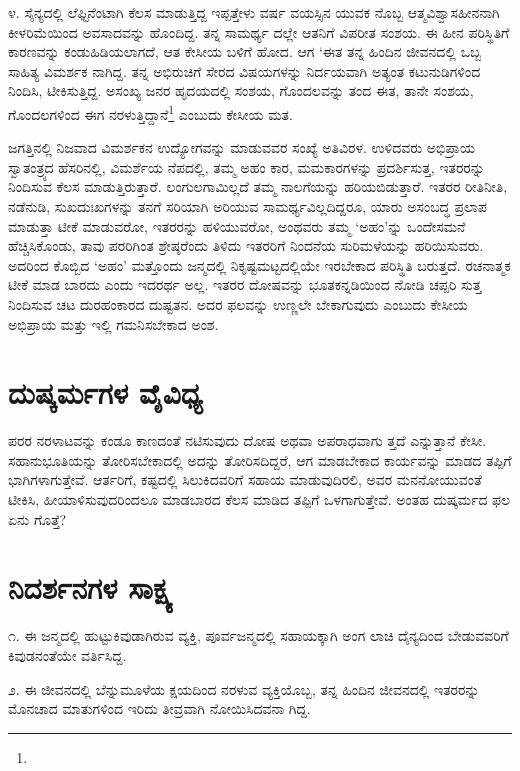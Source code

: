 ೪. ಸೈನ್ಯದಲ್ಲಿ ಲೆಫ್ಟಿನೆಂಟಾಗಿ ಕೆಲಸ ಮಾಡುತ್ತಿದ್ದ ಇಪ್ಪತ್ತೇಳು ವರ್ಷ ವಯಸ್ಸಿನ ಯುವಕ ನೊಬ್ಬ ಆತ್ಮವಿಶ್ವಾಸಹೀನನಾಗಿ ಕೀಳರಿಮೆಯಿಂದ ಅವಸಾದವನ್ನು ಹೊಂದಿದ್ದ. ತನ್ನ ಸಾಮರ್ಥ್ಯ ದಲ್ಲೇ ಆತನಿಗೆ ವಿಪರೀತ ಸಂಶಯ. ಈ ಹೀನ ಪರಿಸ್ಥಿತಿಗೆ ಕಾರಣವನ್ನು ಕಂಡುಹಿಡಿಯಲಾಗದೆ, ಆತ ಕೇಸೀಯ ಬಳಿಗೆ ಹೋದ. ಆಗ ‘ಈತ ತನ್ನ ಹಿಂದಿನ ಜೀವನದಲ್ಲಿ ಒಬ್ಬ ಸಾಹಿತ್ಯ ವಿಮರ್ಶಕ ನಾಗಿದ್ದ. ತನ್ನ ಅಭಿರುಚಿಗೆ ಸೇರದ ವಿಷಯಗಳನ್ನು ನಿರ್ದಯವಾಗಿ ಅತ್ಯಂತ ಕಟುನುಡಿಗಳಿಂದ ನಿಂದಿಸಿ, ಟೀಕಿಸುತ್ತಿದ್ದ. ಅಸಂಖ್ಯ ಜನರ ಹೃದಯದಲ್ಲಿ ಸಂಶಯ, ಗೊಂದಲವನ್ನು ತಂದ ಈತ, ತಾನೇ ಸಂಶಯ, ಗೊಂದಲಗಳಿಂದ ಈಗ ನರಳುತ್ತಿದ್ದಾನೆ\footnote{} ಎಂಬುದು ಕೇಸೀಯ ಮತ.

ಜಗತ್ತಿನಲ್ಲಿ ನಿಜವಾದ ವಿಮರ್ಶಕನ ಉದ್ಯೋಗವನ್ನು ಮಾಡುವವರ ಸಂಖ್ಯೆ ಅತಿವಿರಳ. ಉಳಿದವರು ಅಭಿಪ್ರಾಯ ಸ್ವಾತಂತ್ರ್ಯದ ಹೆಸರಿನಲ್ಲಿ, ವಿಮರ್ಶೆಯ ನೆಪದಲ್ಲಿ, ತಮ್ಮ ಅಹಂ ಕಾರ, ಮಮಕಾರಗಳನ್ನು ಪ್ರದರ್ಶಿಸುತ್ತ, ಇತರರನ್ನು ನಿಂದಿಸುವ ಕೆಲಸ ಮಾಡುತ್ತಿರುತ್ತಾರೆ. ಲಂಗುಲಗಾಮಿಲ್ಲದೆ ತಮ್ಮ ನಾಲಗೆಯನ್ನು ಹರಿಯಬಿಡುತ್ತಾರೆ. ಇತರರ ರೀತಿನೀತಿ, ನಡೆನುಡಿ, ಸುಖದುಃಖಗಳನ್ನು ತನಗೆ ಸರಿಯಾಗಿ ಅರಿಯುವ ಸಾಮರ್ಥ್ಯವಿಲ್ಲದಿದ್ದರೂ, ಯಾರು ಅಸಂಬದ್ಧ ಪ್ರಲಾಪ ಮಾಡುತ್ತಾ ಟೀಕೆ ಮಾಡುವರೋ, ಇತರರನ್ನು ಹಳಿಯುವರೋ, ಅಂಥವರು ತಮ್ಮ ‘ಅಹಂ’ನ್ನು ಒಂದೇಸಮನೆ ಹೆಚ್ಚಿಸಿಕೊಂಡು, ತಾವು ಪರರಿಗಿಂತ ಶ್ರೇಷ್ಠರೆಂದು ತಿಳಿದು ಇತರರಿಗೆ ನಿಂದನೆಯ ಸುರಿಮಳೆಯನ್ನು ಹರಿಯಿಸುವರು. ಅದರಿಂದ ಕೊಬ್ಬಿದ ‘ಅಹಂ’ ಮತ್ತೊಂದು ಜನ್ಮದಲ್ಲಿ ನಿಕೃಷ್ಟಮಟ್ಟದಲ್ಲಿಯೇ ಇರಬೇಕಾದ ಪರಿಸ್ಥಿತಿ ಬರುತ್ತದೆ. ರಚನಾತ್ಮಕ ಟೀಕೆ ಮಾಡ ಬಾರದು ಎಂದು ಇದರರ್ಥ ಅಲ್ಲ. ಇತರರ ದೋಷವನ್ನು ಭೂತಕನ್ನಡಿಯಿಂದ ನೋಡಿ ಚಪ್ಪರಿ ಸುತ್ತ ನಿಂದಿಸುವ ಚಟ ದುರಹಂಕಾರದ ದುಷ್ಟತನ. ಅದರ ಫಲವನ್ನು ಉಣ್ಣಲೇ ಬೇಕಾಗುವುದು ಎಂಬುದು ಕೇಸೀಯ ಅಭಿಪ್ರಾಯ ಮತ್ತು ಇಲ್ಲಿ ಗಮನಿಸಬೇಕಾದ ಅಂಶ.


\section{ದುಷ್ಕರ್ಮಗಳ ವೈವಿಧ್ಯ}

ಪರರ ನರಳಾಟವನ್ನು ಕಂಡೂ ಕಾಣದಂತೆ ನಟಿಸುವುದು ದೋಷ ಅಥವಾ ಅಪರಾಧವಾಗು ತ್ತದೆ ಎನ್ನುತ್ತಾನೆ ಕೇಸೀ. ಸಹಾನುಭೂತಿಯನ್ನು ತೋರಿಸಬೇಕಾದಲ್ಲಿ ಅದನ್ನು ತೋರಿಸದಿದ್ದರೆ, ಆಗ ಮಾಡಬೇಕಾದ ಕಾರ್ಯವನ್ನು ಮಾಡದ ತಪ್ಪಿಗೆ  ಭಾಗಿಗಳಾಗುತ್ತೇವೆ. ಆರ್ತರಿಗೆ, ಕಷ್ಟದಲ್ಲಿ ಸಿಲುಕಿದವರಿಗೆ ಸಹಾಯ ಮಾಡುವುದಿರಲಿ, ಅವರ ಮನನೋಯುವಂತೆ ಟೀಕಿಸಿ, ಹೀಯಾಳಿಸುವುದರಿಂದಲೂ ಮಾಡಬಾರದ ಕೆಲಸ ಮಾಡಿದ ತಪ್ಪಿಗೆ  ಒಳಗಾಗುತ್ತೇವೆ. ಅಂತಹ ದುಷ್ಕರ್ಮದ ಫಲ ಏನು ಗೊತ್ತೆ?


\section{ನಿದರ್ಶನಗಳ ಸಾಕ್ಷ್ಯ}

೧. ಈ ಜನ್ಮದಲ್ಲಿ ಹುಟ್ಟುಕಿವುಡಾಗಿರುವ ವ್ಯಕ್ತಿ, ಪೂರ್ವಜನ್ಮದಲ್ಲಿ ಸಹಾಯಕ್ಕಾಗಿ ಅಂಗ ಲಾಚಿ ದೈನ್ಯದಿಂದ ಬೇಡುವವರಿಗೆ ಕಿವುಡನಂತೆಯೇ ವರ್ತಿಸಿದ್ದ.

೨. ಈ ಜೀವನದಲ್ಲಿ ಬೆನ್ನುಮೂಳೆಯ ಕ್ಷಯದಿಂದ ನರಳುವ ವ್ಯಕ್ತಿಯೊಬ್ಬ, ತನ್ನ ಹಿಂದಿನ ಜೀವನದಲ್ಲಿ ಇತರರನ್ನು ಮೊನಚಾದ ಮಾತುಗಳಿಂದ ಇರಿದು ತೀವ್ರವಾಗಿ ನೋಯಿಸಿದವನಾ ಗಿದ್ದ.

